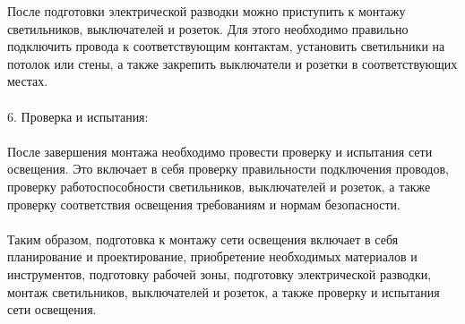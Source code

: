 \documentclass{article}
\begin{document}
После подготовки электрической разводки можно приступить к монтажу светильников, выключателей и розеток. Для этого необходимо правильно подключить провода к соответствующим контактам, установить светильники на потолок или стены, а также закрепить выключатели и розетки в соответствующих местах.\\
~\\
6. Проверка и испытания:\\
~\\
После завершения монтажа необходимо провести проверку и испытания сети освещения. Это включает в себя проверку правильности подключения проводов, проверку работоспособности светильников, выключателей и розеток, а также проверку соответствия освещения требованиям и нормам безопасности.\\
~\\
Таким образом, подготовка к монтажу сети освещения включает в себя планирование и проектирование, приобретение необходимых материалов и инструментов, подготовку рабочей зоны, подготовку электрической разводки, монтаж светильников, выключателей и розеток, а также проверку и испытания сети освещения.
\end{document}
